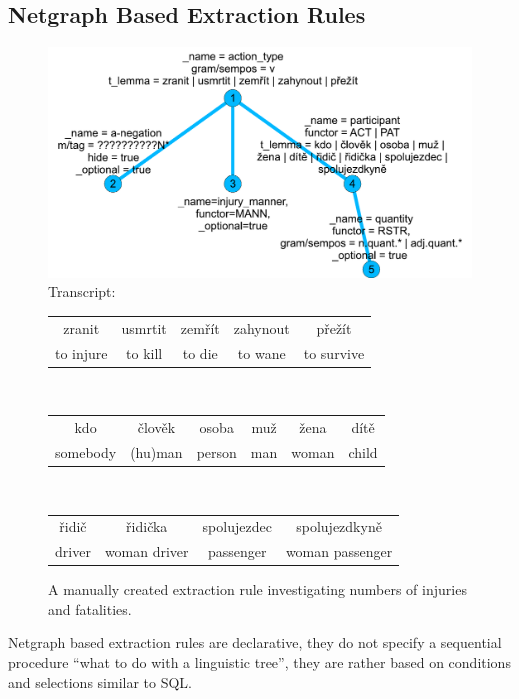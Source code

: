 \subsection{Netgraph Based Extraction Rules}

\begin{figure}
	\centering
		\includegraphics[width=0.7\hsize]{extract_patern}		
\\Transcript:\\
\begin{tabular}{|c|c|c|c|c|}
\hline
zranit & usmrtit & zemřít & zahynout & přežít\\
to injure & to kill & to die & to wane & to survive\\
\hline
\end{tabular}
\\\begin{tabular}{|c|c|c|c|c|c|}
\hline
kdo & člověk & osoba & muž & žena & dítě\\
somebody & (hu)man & person & man & woman & child\\
\hline
\end{tabular}
\\\begin{tabular}{|c|c|c|c|}
\hline
řidič & řidička & spolujezdec & spolujezdkyně\\
driver & woman driver & passenger & woman passenger\\	
\hline
\end{tabular}		
	\caption{A manually created extraction rule investigating numbers of injuries and fatalities.}
	\label{fig:manual_extract_patern}
\end{figure}



Netgraph based extraction rules are declarative, they do not specify a sequential procedure ``what to do with a linguistic tree'', they are rather based on conditions and selections similar to SQL.

